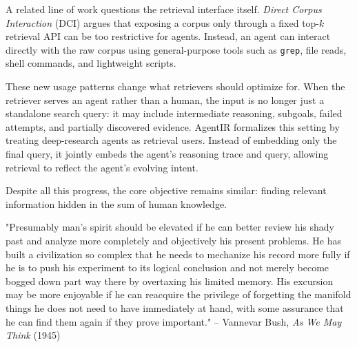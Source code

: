A related line of work questions the retrieval interface itself.
\emph{Direct Corpus Interaction} (DCI)  argues that exposing a corpus only through a fixed top-$k$ retrieval API can be too restrictive for agents. Instead, an agent can interact directly with the raw corpus using general-purpose tools such as \texttt{grep}, file reads, shell commands, and lightweight scripts.


These new usage patterns change what retrievers should optimize for. When the retriever serves an agent rather than a human, the input is no longer just a standalone search query: it may include intermediate reasoning, subgoals, failed attempts, and partially discovered evidence. AgentIR  formalizes this setting by treating deep-research agents as retrieval users. Instead of embedding only the final query, it jointly embeds the agent's reasoning trace and query, allowing retrieval to reflect the agent's evolving intent.

Despite all this progress, the core objective remains similar: finding relevant information hidden in the sum of human knowledge.

\begin{lavenderkaobox}
"Presumably man's spirit should be elevated if he can better review his shady past and analyze more completely and objectively his present problems. He has built a civilization so complex that he needs to mechanize his record more fully if he is to push his experiment to its logical conclusion and not merely become bogged down part way there by overtaxing his limited memory. His excursion may be more enjoyable if he can reacquire the privilege of forgetting the manifold things he does not need to have immediately at hand, with some assurance that he can find them again if they prove important."
\flushright -- Vannevar Bush, \emph{As We May Think} (1945)
\end{lavenderkaobox}




